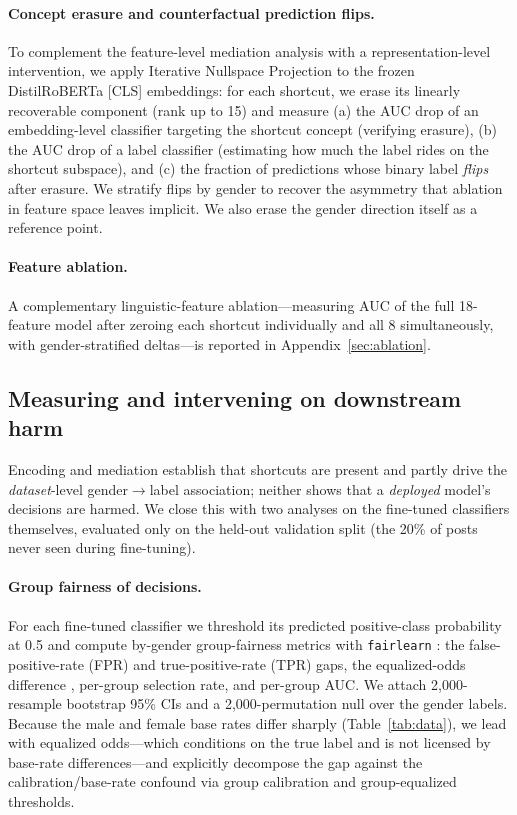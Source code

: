 \documentclass[11pt]{article}
\begin{document}
\paragraph{Concept erasure and counterfactual prediction flips.}
To complement the feature-level mediation analysis with a representation-level intervention, we apply Iterative Nullspace Projection \citep{ravfogel2020null} to the frozen DistilRoBERTa [CLS] embeddings: for each shortcut, we erase its linearly recoverable component (rank up to 15) and measure (a) the AUC drop of an embedding-level classifier targeting the shortcut concept (verifying erasure), (b) the AUC drop of a label classifier (estimating how much the label rides on the shortcut subspace), and (c) the fraction of predictions whose binary label \emph{flips} after erasure. We stratify flips by gender to recover the asymmetry that ablation in feature space leaves implicit. We also erase the gender direction itself as a reference point.

\paragraph{Feature ablation.}
A complementary linguistic-feature ablation---measuring AUC of the full 18-feature model after zeroing each shortcut individually and all 8 simultaneously, with gender-stratified deltas---is reported in Appendix~\ref{sec:ablation}.

\subsection{Measuring and intervening on downstream harm}
\label{sec:methods-harm}

Encoding and mediation establish that shortcuts are present and partly drive the \emph{dataset}-level gender$\to$label association; neither shows that a \emph{deployed} model's decisions are harmed. We close this with two analyses on the fine-tuned classifiers themselves, evaluated only on the held-out validation split (the 20\% of posts never seen during fine-tuning).

\paragraph{Group fairness of decisions.}
For each fine-tuned classifier we threshold its predicted positive-class probability at 0.5 and compute by-gender group-fairness metrics with \texttt{fairlearn} \citep{bird2020fairlearn}: the false-positive-rate (FPR) and true-positive-rate (TPR) gaps, the equalized-odds difference \citep{hardt2016equality}, per-group selection rate, and per-group AUC. We attach 2{,}000-resample bootstrap 95\% CIs and a 2{,}000-permutation null over the gender labels. Because the male and female base rates differ sharply (Table~\ref{tab:data}), we lead with equalized odds---which conditions on the true label and is not licensed by base-rate differences---and explicitly decompose the gap against the calibration/base-rate confound \citep{chouldechova2017fair,kleinberg2017inherent} via group calibration and group-equalized thresholds.
\end{document}
